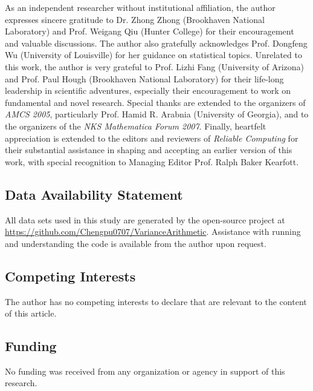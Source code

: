 \documentclass[twoside]{article}
\numberwithin{equation}{section}
\begin{document}
As an independent researcher without institutional affiliation, the author expresses sincere gratitude to Dr. Zhong Zhong (Brookhaven National Laboratory) and Prof. Weigang Qiu (Hunter College) for their encouragement and valuable discussions.
The author also gratefully acknowledges Prof. Dongfeng Wu (University of Louisville) for her guidance on statistical topics.
Unrelated to this work, the author is very grateful to Prof. Lizhi Fang (University of Arizona) and Prof. Paul Hough (Brookhaven National Laboratory) for their life-long leadership in scientific adventures, especially their encouragement to work on fundamental and novel research.
Special thanks are extended to the organizers of \emph{AMCS 2005}, particularly Prof. Hamid R. Arabnia (University of Georgia), and to the organizers of the \emph{NKS Mathematica Forum 2007}.
Finally, heartfelt appreciation is extended to the editors and reviewers of \emph{Reliable Computing} for their substantial assistance in shaping and accepting an earlier version of this work, with special recognition to Managing Editor Prof. Ralph Baker Kearfott.


\subsection{Data Availability Statement}

All data sets used in this study are generated by the open-source project at \url{https://github.com/Chengpu0707/VarianceArithmetic}.
Assistance with running and understanding the code is available from the author upon request.


\subsection{Competing Interests}

The author has no competing interests to declare that are relevant to the content of this article.

\subsection{Funding}

No funding was received from any organization or agency in support of this research.
\fi


\ifdefined\ManualReference
\end{document}
